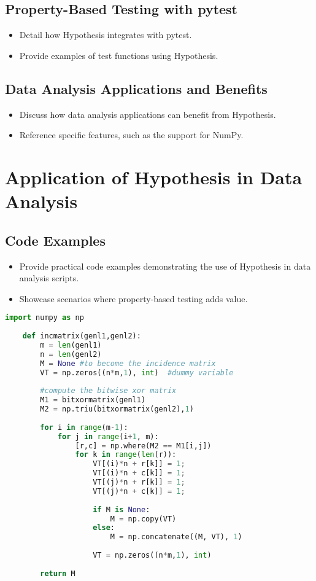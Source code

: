 \documentclass[runningheads]{llncs}
\begin{document}
\subsection{Property-Based Testing with pytest}
\begin{itemize}
  \item Detail how Hypothesis integrates with pytest.
  \item Provide examples of test functions using Hypothesis.
\end{itemize}

\subsection{Data Analysis Applications and Benefits}
\begin{itemize}
  \item Discuss how data analysis applications can benefit from Hypothesis.
  \item Reference specific features, such as the support for NumPy.
\end{itemize}

\section{Application of Hypothesis in Data Analysis}
\subsection{Code Examples}
\begin{itemize}
  \item Provide practical code examples demonstrating the use of Hypothesis in data analysis scripts.
  \item Showcase scenarios where property-based testing adds value.
\end{itemize}

\begin{lstlisting}[language=Python]
    import numpy as np
        
    def incmatrix(genl1,genl2):
        m = len(genl1)
        n = len(genl2)
        M = None #to become the incidence matrix
        VT = np.zeros((n*m,1), int)  #dummy variable
        
        #compute the bitwise xor matrix
        M1 = bitxormatrix(genl1)
        M2 = np.triu(bitxormatrix(genl2),1) 
    
        for i in range(m-1):
            for j in range(i+1, m):
                [r,c] = np.where(M2 == M1[i,j])
                for k in range(len(r)):
                    VT[(i)*n + r[k]] = 1;
                    VT[(i)*n + c[k]] = 1;
                    VT[(j)*n + r[k]] = 1;
                    VT[(j)*n + c[k]] = 1;
                    
                    if M is None:
                        M = np.copy(VT)
                    else:
                        M = np.concatenate((M, VT), 1)
                    
                    VT = np.zeros((n*m,1), int)
        
        return M
\end{lstlisting}
\end{document}
